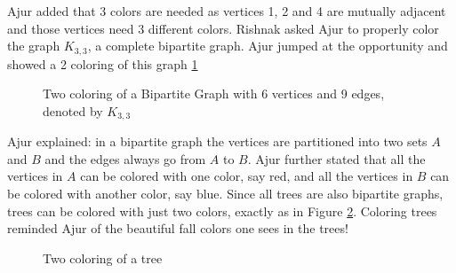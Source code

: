 Ajur added that 3 colors are needed as vertices 1, 2 and 4 are mutually adjacent and those vertices need 3 different colors. 
Rishnak asked Ajur to properly color the graph $K_{3,3}$, a complete bipartite graph. Ajur jumped at the opportunity and showed a 2 coloring of this graph \ref{10g3}
\begin{figure}
\begin{center}
\caption{ Two coloring of a Bipartite Graph with 6 vertices and 9 edges, denoted by $K_{3,3}$}\label{10g3}
\end{center}
\end{figure}

Ajur explained: in a bipartite graph the vertices are partitioned into two sets $A$ and $B$ and the edges always go from $A$ to $B$. Ajur further stated that all the vertices in $A$ can be colored with one color, say red, and all the vertices in $B$ can be colored with another color, say blue. Since all trees are also bipartite graphs, trees can be colored with just two colors, exactly as in Figure \ref{10g4}. Coloring trees reminded Ajur of the beautiful fall colors one sees in the trees!
\begin{figure}
\begin{center}


\caption{Two coloring of a tree }\label{10g4}
\end{center}
\end{figure}


